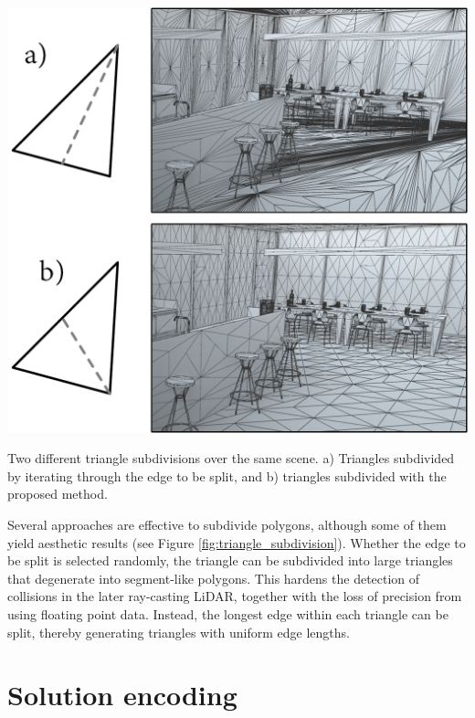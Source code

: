 \begin{marginfigure}[-5.0cm]
    \centering
    \includegraphics[width=\linewidth]{figs/lidar_optimization/triangle_subdivision.png}
	\caption{Two different triangle subdivisions over the same scene. a) Triangles subdivided by iterating through the edge to be split, and b) triangles subdivided with the proposed method.}
	\label{fig:triangle_subdivision}
\end{marginfigure}
Several approaches are effective to subdivide polygons, although some of them yield aesthetic results (see Figure \ref{fig:triangle_subdivision}). Whether the edge to be split is selected randomly, the triangle can be subdivided into large triangles that degenerate into segment-like polygons. This hardens the detection of collisions in the later ray-casting LiDAR, together with the loss of precision from using floating point data. Instead, the longest edge within each triangle can be split, thereby generating triangles with uniform edge lengths.

\section{Solution encoding}

